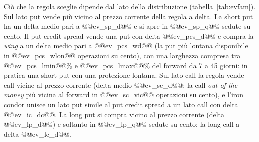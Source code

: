 \documentclass[11pt,a4paper]{article}
\begin{document}
\begin{table}[ht]\centering\footnotesize
\caption{Combinazione scelta per valore atteso massimo per contratto sotto la densità GARCH, per famiglia, 2012--2023, posizioni tenute a scadenza. Quota di sedute con un'operazione (valore atteso positivo), delta di mercato medio in valore assoluto della gamba principale (gamba venduta; gamba comprata per le opzioni in acquisto; put/call per l'iron condor), larghezza in percentuale del forward, rendimento per operazione atteso e realizzato sul margine (sul premio per le opzioni comprate), Sharpe del \emph{ladder} mensile (mediana delle quattro scadenze); Sharpe della regola a delta ai prezzi bid-ask, mediana e massimo delle sedici configurazioni (quattro livelli, quattro scadenze), e numero di scadenze su quattro in cui la regola EV supera la mediana delta.}\label{tab:evfam}
\end{table}

Ciò che la regola sceglie dipende dal lato della distribuzione (tabella~\ref{tab:evfam}). Sul lato put vende più vicino al prezzo corrente della regola a delta. La short put ha un delta medio pari a @@ev_sp_d@@ e si apre in @@ev_sp_q@@ sedute su cento. Il put credit spread vende una put con delta @@ev_pcs_d@@ e compra la \emph{wing} a un delta medio pari a @@ev_pcs_wd@@ (la put più lontana disponibile in @@ev_pcs_wlon@@ operazioni su cento), con una larghezza compresa tra @@ev_pcs_lmin@@\% e @@ev_pcs_lmax@@\% del forward da 7 a 45 giorni: in pratica una short put con una protezione lontana. Sul lato call la regola vende call vicine al prezzo corrente (delta medio @@ev_sc_d@@; la call \emph{out-of-the-money} più vicina al forward in @@ev_sc_vic@@ operazioni su cento), e l'iron condor unisce un lato put simile al put credit spread a un lato call con delta @@ev_ic_dc@@. La long put si compra vicino al prezzo corrente (delta @@ev_lp_d@@) e soltanto in @@ev_lp_q@@ sedute su cento; la long call a delta @@ev_lc_d@@.
\end{document}
